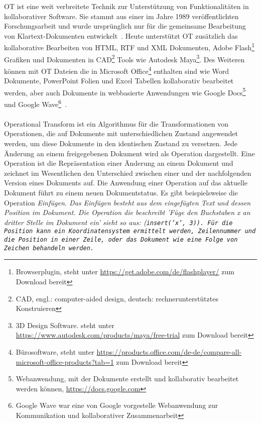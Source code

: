 \gls{OT} ist eine weit verbreitete Technik zur Unterstützung von Funktionalitäten in \gls{kollaborativ}er Software.
Sie stammt aus einer im Jahre 1989 veröffentlichten Forschungsarbeit und wurde ursprünglich nur für die gemeinsame Bearbeitung von Klartext-Dokumenten entwickelt~\cite{ot_paper}.
Heute unterstützt \gls{OT} zusätzlich das \gls{kollaborativ}e Bearbeiten von \gls{HTML}, RTF und XML Dokumenten, Adobe Flash\footnote{ Browserplugin, steht unter \url{https://get.adobe.com/de/flashplayer/} zum Download bereit} Grafiken und Dokumenten in CAD\footnote{ CAD, engl.: computer-aided design, deutsch: rechnerunterstütztes Konstruieren} Tools wie Autodesk Maya\footnote{ 3D Design Software. steht unter \url{https://www.autodesk.com/products/maya/free-trial} zum Download bereit}.
Des Weiteren können mit \gls{OT} Dateien die in Microsoft Office\footnote{ Bürosoftware, steht unter \url{https://products.office.com/de-de/compare-all-microsoft-office-products?tab=1} zum Download bereit} enthalten sind wie Word Dokumente, PowerPoint Folien und Excel Tabellen kollaborativ bearbeitet werden, aber auch Dokumente in webbasierte Anwendungen wie Google Docs\footnote{ Webanwendung, mit der Dokumente erstellt und kollaborativ bearbeitet werden können, \url{https://docs.google.com}} und Google Wave\footnote{ Google Wave war eine von Google vorgestelle Webanwendung zur Kommunikation und kollaborativer Zusammenarbeit}~\cite{ot-faq}.\\\\
%
%
Operational Transform ist ein Algorithmus für die Transformationen von Operationen, die auf Dokumente mit unterschiedlichen Zustand angewendet werden, um diese Dokumente in den identischen Zustand zu versetzen.
Jede Änderung an einem freigegebenen Dokument wird als Operation dargestellt.
Eine Operation ist die Repräsentation einer Änderung an einem Dokument und zeichnet im Wesentlichen den Unterschied zwischen einer und der nachfolgenden Version eines Dokuments auf.
Die Anwendung einer Operation auf das aktuelle Dokument führt zu einem neuen Dokumentstatus.
Es gibt beispielsweise die Operation \it{Einfügen}. 
Das Einfügen besteht aus dem eingefügten Text und dessen Position im Dokument. Die Operation die beschreibt 'Füge den Buchstaben x an dritter Stelle im Dokument ein' sieht so aus: (\tt{insert('x', 3)}).
Für die Position kann ein Koordinatensystem ermittelt werden, Zeilennummer und die Position in einer Zeile, oder das Dokument wie eine Folge von Zeichen behandeln werden.\\

